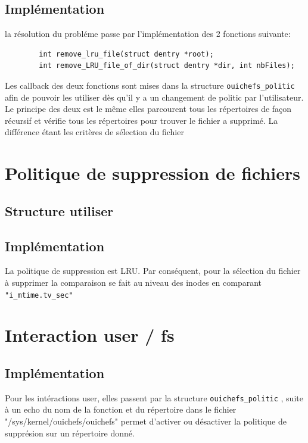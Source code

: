 \documentclass{article}
\begin{document}
	\subsection{Implémentation}
	la résolution du probléme passe par l'implémentation des 2 fonctions suivante:
	\begin{lstlisting}
		int remove_lru_file(struct dentry *root);
		int remove_LRU_file_of_dir(struct dentry *dir, int nbFiles);
	\end{lstlisting}
	Les callback des deux fonctions sont mises dans la structure \verb|ouichefs_politic| afin de pouvoir les utiliser dès qu'il y a un changement de politic par l'utilisateur.
	\newline
	Le principe des deux est le même elles parcourent tous les répertoires de façon récursif et vérifie tous les répertoires pour trouver le fichier a supprimé. 
	\newline
	La différence étant les critères de sélection du fichier
	\section{Politique de suppression de fichiers}
	\subsection{Structure utiliser}
	\subsection{Implémentation}
	La politique de suppression est LRU. Par conséquent, pour la sélection du fichier à supprimer la comparaison se fait au niveau des inodes en comparant \verb|"i_mtime.tv_sec"|
	\section{Interaction user / fs}
	\subsection{Implémentation}
	Pour les intéractions user, elles passent par la structure \verb|ouichefs_politic| , suite à un echo du nom de la fonction et du répertoire dans le fichier	"/sys/kernel/ouichefs/ouichefs" permet d'activer ou désactiver
	la politique de supprésion sur un répertoire donné.
\end{document}
